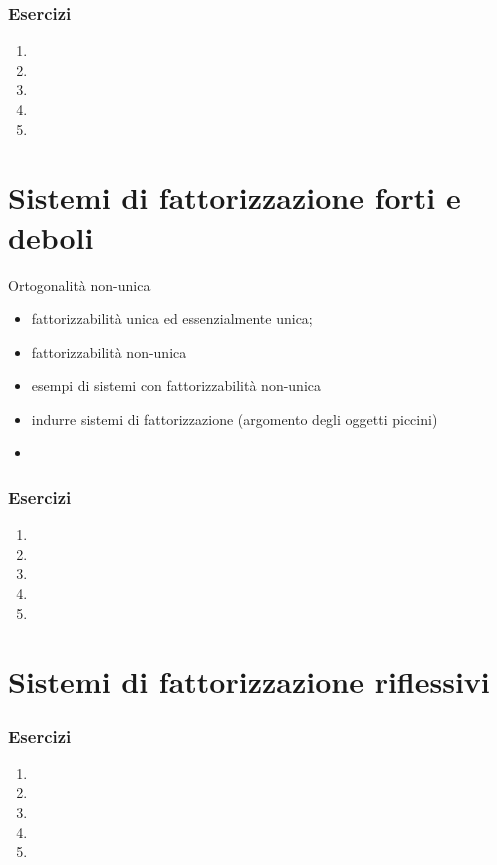 \subsubsection*{Esercizi}
\begin{enumerate}
	\item
	\item
	\item
	\item
	\item
\end{enumerate}
\section[Fattorizzazione]{Sistemi di fattorizzazione forti e deboli}
Ortogonalità non-unica
\begin{itemize}
	\item fattorizzabilità unica ed essenzialmente unica;
	\item fattorizzabilità non-unica
	\item esempi di sistemi con fattorizzabilità non-unica
	\item indurre sistemi di fattorizzazione (argomento degli oggetti piccini)
	\item
\end{itemize}
\subsubsection*{Esercizi}
\begin{enumerate}
	\item
	\item
	\item
	\item
	\item
\end{enumerate}
\section[Riflessività]{Sistemi di fattorizzazione riflessivi}
\subsubsection*{Esercizi}
\begin{enumerate}
	\item
	\item
	\item
	\item
	\item
\end{enumerate}
